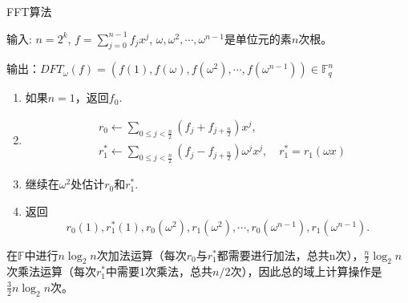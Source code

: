\documentclass[10pt]{ctexart}
\begin{document}
{\color{red}FFT算法}

输入: $n = 2^k$, $f = \sum_{j = 0}^{n-1}f_j x^j$, $\omega, \omega^2, \cdots, \omega^{n-1}$是单位元的素$n$次根。

输出：$DFT_{\omega}(f)  = (f(1), f(\omega),f(\omega^2), \cdots, f(\omega^{n-1})) \in \mathbb{F}_q^n$
\begin{enumerate}
    \item 如果$n=1$，返回$f_0$.
    \item 
    \begin{displaymath}
        \begin{aligned}
            & r_0 \leftarrow \sum_{0 \le j < \frac{n}{2}}(f_j + f_{j+\frac{n}{2}})x^j, \\
            & r_1^* \leftarrow \sum_{0 \le j < \frac{n}{2}}(f_j - f_{j+\frac{n}{2}})\omega^j x^j, \quad r_1^* = r_1(\omega x)
        \end{aligned}       
    \end{displaymath}
    \item 继续在$\omega^2$处估计$r_0$和$r_1^*$.
    \item 返回
    $$
    r_0(1),r_1^*(1),r_0(\omega^2),r_1(\omega^2), \cdots, r_0(\omega^{n-1}),r_1(\omega^{n-1}).
    $$
\end{enumerate}
在$\mathbb{F}$中进行$n\log_2n$次加法运算（每次$r_0$与$r_1^*$都需要进行加法，总共n次），$\frac{n}{2}\log_2n$次乘法运算（每次$r_1^*$中需要1次乘法，总共$n/2$次），因此总的域上计算操作是$\frac{3}{2}n\log_2n$次。
\end{document}

